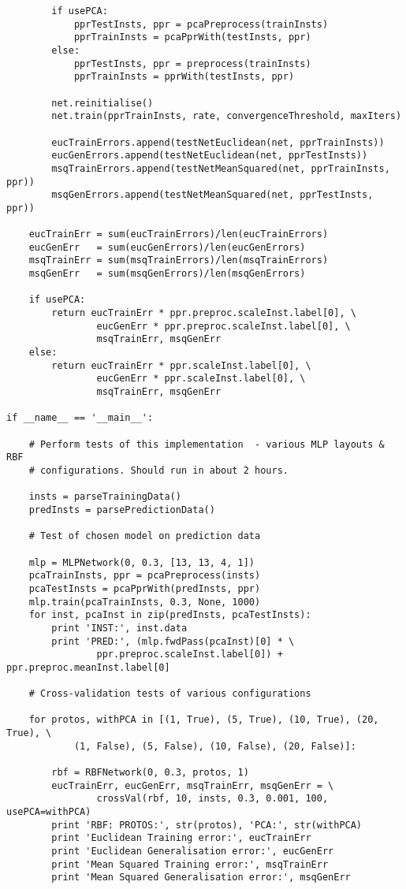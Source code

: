 \documentclass{article}
\begin{document}
\begin{verbatim}
        if usePCA:
            pprTestInsts, ppr = pcaPreprocess(trainInsts)
            pprTrainInsts = pcaPprWith(testInsts, ppr)
        else:
            pprTestInsts, ppr = preprocess(trainInsts)
            pprTrainInsts = pprWith(testInsts, ppr)

        net.reinitialise()
        net.train(pprTrainInsts, rate, convergenceThreshold, maxIters)

        eucTrainErrors.append(testNetEuclidean(net, pprTrainInsts))
        eucGenErrors.append(testNetEuclidean(net, pprTestInsts))
        msqTrainErrors.append(testNetMeanSquared(net, pprTrainInsts, ppr))
        msqGenErrors.append(testNetMeanSquared(net, pprTestInsts, ppr))

    eucTrainErr = sum(eucTrainErrors)/len(eucTrainErrors)
    eucGenErr   = sum(eucGenErrors)/len(eucGenErrors)
    msqTrainErr = sum(msqTrainErrors)/len(msqTrainErrors)
    msqGenErr   = sum(msqGenErrors)/len(msqGenErrors)

    if usePCA:
        return eucTrainErr * ppr.preproc.scaleInst.label[0], \
                eucGenErr * ppr.preproc.scaleInst.label[0], \
                msqTrainErr, msqGenErr
    else:
        return eucTrainErr * ppr.scaleInst.label[0], \
                eucGenErr * ppr.scaleInst.label[0], \
                msqTrainErr, msqGenErr

if __name__ == '__main__':

    # Perform tests of this implementation  - various MLP layouts & RBF
    # configurations. Should run in about 2 hours.

    insts = parseTrainingData()
    predInsts = parsePredictionData()

    # Test of chosen model on prediction data

    mlp = MLPNetwork(0, 0.3, [13, 13, 4, 1])
    pcaTrainInsts, ppr = pcaPreprocess(insts)
    pcaTestInsts = pcaPprWith(predInsts, ppr)
    mlp.train(pcaTrainInsts, 0.3, None, 1000)
    for inst, pcaInst in zip(predInsts, pcaTestInsts):
        print 'INST:', inst.data
        print 'PRED:', (mlp.fwdPass(pcaInst)[0] * \
                ppr.preproc.scaleInst.label[0]) + ppr.preproc.meanInst.label[0]

    # Cross-validation tests of various configurations

    for protos, withPCA in [(1, True), (5, True), (10, True), (20, True), \
            (1, False), (5, False), (10, False), (20, False)]:

        rbf = RBFNetwork(0, 0.3, protos, 1)
        eucTrainErr, eucGenErr, msqTrainErr, msqGenErr = \
                crossVal(rbf, 10, insts, 0.3, 0.001, 100, usePCA=withPCA)
        print 'RBF: PROTOS:', str(protos), 'PCA:', str(withPCA)
        print 'Euclidean Training error:', eucTrainErr
        print 'Euclidean Generalisation error:', eucGenErr
        print 'Mean Squared Training error:', msqTrainErr
        print 'Mean Squared Generalisation error:', msqGenErr


\end{verbatim}
\end{document}
